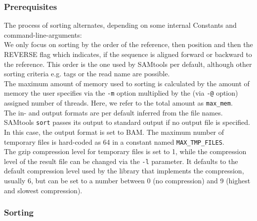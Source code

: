 \subsubsection{Prerequisites}
The process of sorting alternates, depending on some internal Constants and command-line-arguments: \\
We only focus on sorting by the order of the reference, then position and then the REVERSE flag which indicates, if the sequence is aligned forward or backward to the reference. This order is the one used by SAMtools per default, although other sorting criteria e.g. tags or the read name are possible.\\
The maximum amount of memory used to sorting is calculated by the amount of memory the user specifies via the \texttt{-m} option multiplied by the (via \texttt{-@} option) assigned number of threads. Here, we refer to the total amount as \texttt{max\_mem}. \\
The in- and output formats are per default inferred from the file names. \\
SAMtools \texttt{sort} passes its output to standard output if no output file is specified. In this case, the output format is set to BAM.
The maximum number of temporary files is hard-coded as 64 in a constant named \texttt{MAX\_TMP\_FILES}. \\
The gzip compression level for temporary files is set to 1, while the compression level of the result file can be changed via the \texttt{-l} parameter. It defaults to the default compression level used by the library that implements the compression, usually 6, but can be set to a number between 0 (no compression) and 9 (highest and slowest compression).

\subsubsection{Sorting} \label{sorting}

